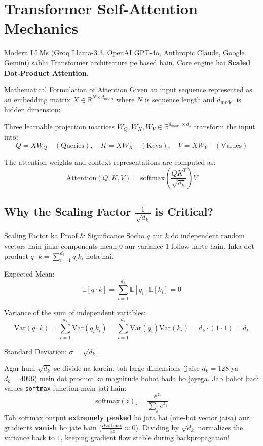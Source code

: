 \documentclass[11pt,a4paper,twoside]{report}
\begin{document}
\section{Transformer Self-Attention Mechanics}

Modern LLMs (Groq Llama-3.3, OpenAI GPT-4o, Anthropic Claude, Google Gemini) sabhi Transformer architecture pe based hain. Core engine hai \textbf{Scaled Dot-Product Attention}.

\begin{conceptbox}{Mathematical Formulation of Attention}
Given an input sequence represented as an embedding matrix $X \in \mathbb{R}^{N \times d_{\text{model}}}$ where $N$ is sequence length and $d_{\text{model}}$ is hidden dimension:

Three learnable projection matrices $W_Q, W_K, W_V \in \mathbb{R}^{d_{\text{model}} \times d_k}$ transform the input into:
\begin{equation}
Q = X W_Q \quad (\text{Queries}), \quad K = X W_K \quad (\text{Keys}), \quad V = X W_V \quad (\text{Values})
\end{equation}

The attention weights and context representations are computed as:
\begin{equation}
\text{Attention}(Q, K, V) = \text{softmax}\left(\frac{Q K^T}{\sqrt{d_k}}\right) V
\end{equation}
\end{conceptbox}

\subsection{Why the Scaling Factor $\frac{1}{\sqrt{d_k}}$ is Critical?}

\begin{hindibox}{Scaling Factor ka Proof \& Significance}
Socho $q$ aur $k$ do independent random vectors hain jinke components mean $0$ aur variance $1$ follow karte hain.
Inka dot product $q \cdot k = \sum_{i=1}^{d_k} q_i k_i$ hota hai.

Expected Mean:
$$\mathbb{E}[q \cdot k] = \sum_{i=1}^{d_k} \mathbb{E}[q_i] \mathbb{E}[k_i] = 0$$

Variance of the sum of independent variables:
$$\text{Var}(q \cdot k) = \sum_{i=1}^{d_k} \text{Var}(q_i k_i) = \sum_{i=1}^{d_k} \text{Var}(q_i) \text{Var}(k_i) = d_k \cdot (1 \cdot 1) = d_k$$

Standard Deviation: $\sigma = \sqrt{d_k}$.

Agar hum $\sqrt{d_k}$ se divide na karein, toh large dimensions (jaise $d_k = 128$ ya $d_k = 4096$) mein dot product ka magnitude bohot bada ho jayega.
Jab bohot badi values \texttt{softmax} function mein jati hain:
$$\text{softmax}(z)_i = \frac{e^{z_i}}{\sum_j e^{z_j}}$$
Toh softmax output \textbf{extremely peaked} ho jata hai (one-hot vector jaisa) aur gradients \textbf{vanish} ho jate hain ($\frac{\partial \text{softmax}}{\partial z} \approx 0$).
Dividing by $\sqrt{d_k}$ normalizes the variance back to $1$, keeping gradient flow stable during backpropagation!
\end{hindibox}
\end{document}
